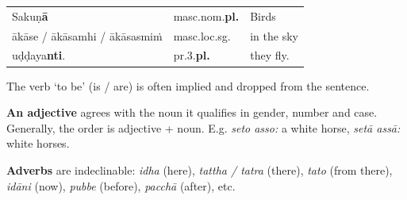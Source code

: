 \documentclass[11pt,oneside]{memoir}
\begin{document}
\begin{center}
\begin{tabular}{lll}
Sakuṇ\textbf{ā} & masc.nom.\textbf{pl.} & Birds\\[0pt]
ākāse / ākāsamhi / ākāsasmiṁ & masc.loc.sg. & in the sky\\[0pt]
uḍḍaya\textbf{nti}. & pr.3.\textbf{pl.} & they fly.\\[0pt]
\end{tabular}
\end{center}

The verb `to be' (is / are) is often implied and dropped from the sentence.

\textbf{An adjective} agrees with the noun it qualifies in gender, number and case. \\[0pt]
Generally, the order is adjective + noun. E.g. \emph{seto asso:} a white horse, \emph{setā assā:} white horses.

\textbf{Adverbs} are indeclinable: \emph{idha} (here), \emph{tattha / tatra} (there), \emph{tato}
(from there), \emph{idāni} (now), \emph{pubbe} (before), \emph{pacchā} (after), etc.

\bigskip
\end{document}
